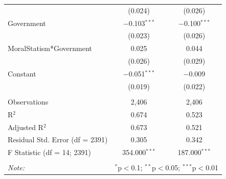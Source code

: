\documentclass[12pt,]{article}
\begin{document}
\begin{table}[!htbp]
\begin{tabular}{@{\extracolsep{5pt}}lcc}
  & (0.024) & (0.026) \\ 
  Government & $-$0.103$^{***}$ & $-$0.100$^{***}$ \\ 
  & (0.023) & (0.026) \\ 
  MoralStatism*Government & 0.025 & 0.044 \\ 
  & (0.026) & (0.029) \\ 
  Constant & $-$0.051$^{***}$ & $-$0.009 \\ 
  & (0.019) & (0.022) \\ 
 \hline \\[-1.8ex] 
Observations & 2,406 & 2,406 \\ 
R$^{2}$ & 0.674 & 0.523 \\ 
Adjusted R$^{2}$ & 0.673 & 0.521 \\ 
Residual Std. Error (df = 2391) & 0.305 & 0.342 \\ 
F Statistic (df = 14; 2391) & 354.000$^{***}$ & 187.000$^{***}$ \\ 
\hline 
\hline \\[-1.8ex] 
\textit{Note:}  & \multicolumn{2}{r}{$^{*}$p$<$0.1; $^{**}$p$<$0.05; $^{***}$p$<$0.01} \\ 
\end{tabular} 
\end{table}
\end{document}

